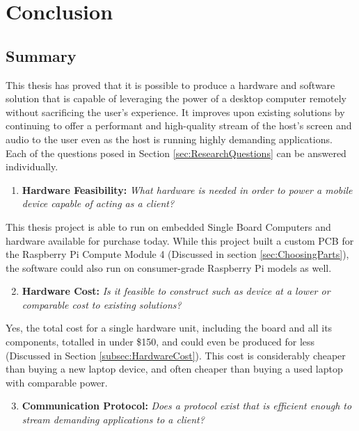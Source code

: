 \chapter{Conclusion}

\label{Chapter7}


\section{Summary}\label{sec:ConclusionSummary}

This thesis has proved that it is possible to produce a hardware and software solution that is capable of leveraging the power of a desktop computer remotely without sacrificing the user's experience.
It improves upon existing solutions by continuing to offer a performant and high-quality stream of the host's screen and audio to the user even as the host is running highly demanding applications.
Each of the questions posed in Section \ref{sec:ResearchQuestions} can be answered individually.

\begin{enumerate}
  \setcounter{enumi}{0} %
  \item \textbf{Hardware Feasibility:} \emph{What hardware is needed in order to power a mobile device capable of acting as a client?}
\end{enumerate}

\noindent
This thesis project is able to run on embedded Single Board Computers and hardware available for purchase today.
While this project built a custom PCB for the Raspberry Pi Compute Module 4 (Discussed in section \ref{sec:ChoosingParts}), the software could also run on consumer-grade Raspberry Pi models as well.

\begin{enumerate}
  \setcounter{enumi}{1} %
  \item \textbf{Hardware Cost:} \emph{Is it feasible to construct such as device at a lower or comparable cost to existing solutions?}
\end{enumerate}

\noindent
Yes, the total cost for a single hardware unit, including the board and all its components, totalled in under \$150, and could even be produced for less (Discussed in Section \ref{subsec:HardwareCost}).
This cost is considerably cheaper than buying a new laptop device, and often cheaper than buying a used laptop with comparable power.

\begin{enumerate}
  \setcounter{enumi}{2} %
  \item \textbf{Communication Protocol:} \emph{Does a protocol exist that is efficient enough to stream demanding applications to a client?}
\end{enumerate}

